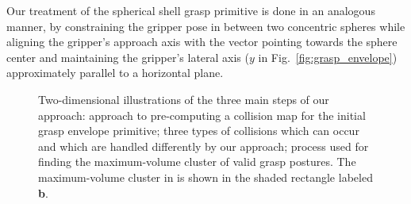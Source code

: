 Our treatment of the spherical shell grasp primitive is done in an analogous manner, by constraining
the gripper pose in between two concentric spheres while aligning the gripper's approach axis with
the vector pointing towards the sphere center and maintaining the gripper's lateral axis ($y$ in
Fig.~\ref{fig:grasp_envelope}) approximately parallel to a horizontal plane. 
\par
\begin{figure}[t!]
\centering
{}
\caption{Two-dimensional illustrations of the three main steps of our approach:  approach to pre-computing a collision map for the initial grasp envelope primitive;  three types of collisions which can occur and which are handled differently by our approach;  process used for finding the maximum-volume cluster of valid grasp postures. The maximum-volume cluster in  is shown in the shaded rectangle labeled \textbf{b}. }
\label{fig:method}
\end{figure}
